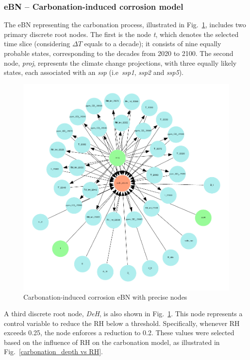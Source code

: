 \subsubsection{eBN -- Carbonation-induced corrosion model}\label{ebn_carbonation_section}
The eBN representing the carbonation process, illustrated in Fig.~\ref{carbonation_ebn}, includes two primary discrete root nodes. The first is the node \textit{t}, which denotes the selected time slice (considering $\Delta T$ equals to a decade); it consists of nine equally probable states, corresponding to the decades from 2020 to 2100. The second node, \textit{proj}, represents the climate change projections, with three equally likely states, each associated with an \textit{ssp} (i.e~\textit{ssp1}, \textit{ssp2} and \textit{ssp5}).
\begin{figure}[H]
    \centering
    \includegraphics[width=\linewidth]{imgs/pdfs/8_carb_ebn.pdf}
    \caption{Carbonation-induced corrosion eBN with precise nodes}\label{carbonation_ebn}
\end{figure}
A third discrete root node, \textit{DeH}, is also shown in Fig.~\ref{carbonation_ebn}. This node represents a control variable to reduce the RH below a threshold. Specifically, whenever RH exceeds 0.25, the node enforces a reduction to 0.2. These values were selected based on the influence of RH on the carbonation model, as illustrated in Fig.~\ref{carbonation_depth vs RH}.
